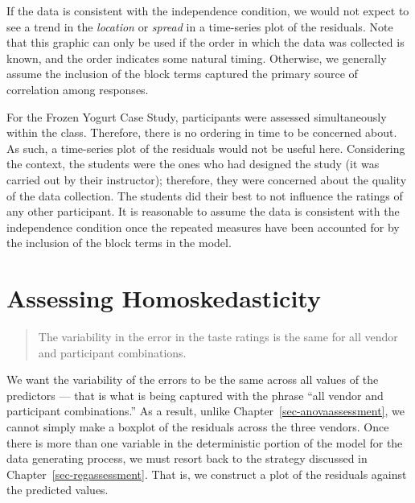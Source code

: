 \documentclass[
  letterpaper,
  DIV=11,
  numbers=noendperiod]{scrreprt}
\theoremstyle{plain}
\theoremstyle{definition}
\theoremstyle{definition}
\theoremstyle{remark}
\begin{document}
\begin{tcolorbox}[enhanced jigsaw, breakable, titlerule=0mm, colframe=quarto-callout-note-color-frame, bottomtitle=1mm, opacityback=0, rightrule=.15mm, toptitle=1mm, arc=.35mm, bottomrule=.15mm, left=2mm, title=\textcolor{quarto-callout-note-color}{\faInfo}\hspace{0.5em}{Graphically Assessing the Independence Condition}, leftrule=.75mm, coltitle=black, toprule=.15mm, colbacktitle=quarto-callout-note-color!10!white, colback=white, opacitybacktitle=0.6]

If the data is consistent with the independence condition, we would not
expect to see a trend in the \emph{location} or \emph{spread} in a
time-series plot of the residuals. Note that this graphic can only be
used if the order in which the data was collected is known, and the
order indicates some natural timing. Otherwise, we generally assume the
inclusion of the block terms captured the primary source of correlation
among responses.

\end{tcolorbox}

For the Frozen Yogurt Case Study, participants were assessed
simultaneously within the class. Therefore, there is no ordering in time
to be concerned about. As such, a time-series plot of the residuals
would not be useful here. Considering the context, the students were the
ones who had designed the study (it was carried out by their
instructor); therefore, they were concerned about the quality of the
data collection. The students did their best to not influence the
ratings of any other participant. It is reasonable to assume the data is
consistent with the independence condition once the repeated measures
have been accounted for by the inclusion of the block terms in the
model.

\section{Assessing Homoskedasticity}\label{assessing-homoskedasticity-2}

\begin{quote}
The variability in the error in the taste ratings is the same for all
vendor and participant combinations.
\end{quote}

We want the variability of the errors to be the same across all values
of the predictors --- that is what is being captured with the phrase
``all vendor and participant combinations.'' As a result, unlike
Chapter~\ref{sec-anovaassessment}, we cannot simply make a boxplot of
the residuals across the three vendors. Once there is more than one
variable in the deterministic portion of the model for the data
generating process, we must resort back to the strategy discussed in
Chapter~\ref{sec-regassessment}. That is, we construct a plot of the
residuals against the predicted values.
\end{document}
